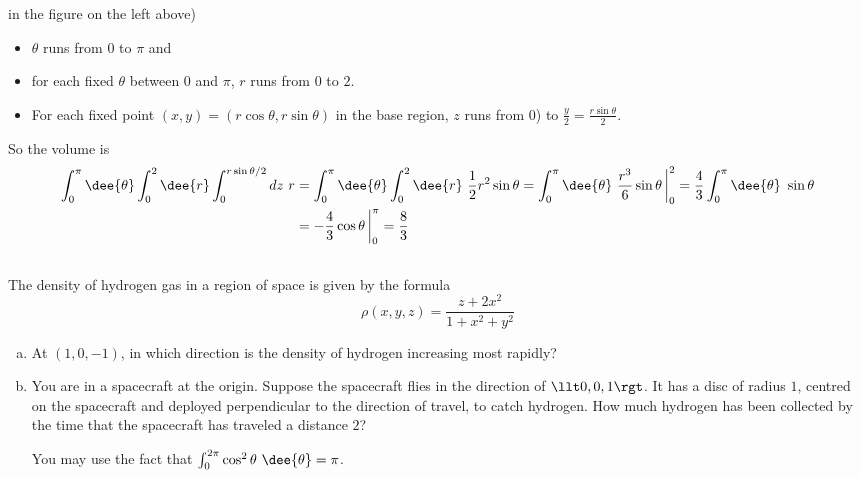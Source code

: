 \begin{solution}
in the figure on the left above)
\begin{itemize}
\item
$\theta$ runs from $0$ to $\pi$ and
\item
for each fixed $\theta$ between $0$ and $\pi$, $r$ runs from $0$ to $2$.
\item
For each fixed point $(x,y)=(r\cos\theta,r\sin\theta)$ in the base
region, $z$ runs from $0$) to $\frac{y}{2}=\frac{r\sin\theta}{2}$.
\end{itemize}
So the volume is
\begin{align*}
\int_0^\pi \dee{\theta}\int_0^2 \dee{r}\int_0^{r\sin\theta/2} dz\ r
&=\int_0^\pi \dee{\theta}\int_0^2 \dee{r}\ \frac{1}{2} r^2\sin\theta
=\int_0^\pi \dee{\theta}\ \frac{r^3}{6}\sin\theta\,\bigg|_0^2
=\frac{4}{3}\int_0^\pi \dee{\theta}\ \sin\theta \\
&=-\frac{4}{3}\cos\theta\,\bigg|_0^\pi
=\frac{8}{3}
\end{align*}
\end{solution}





\subsection*{\Application}

\begin{question}[M200 2014D] %
The density of hydrogen gas in a region of space is given by the formula
\begin{equation*}
\rho(x,y,z) =\frac{z+2x^2}{1+x^2+y^2}
\end{equation*}
\begin{enumerate}[(a)]
\item
At $(1,0,-1)$, in which direction is the density of hydrogen increasing 
most rapidly?
\item
You are in a spacecraft at the origin. Suppose the spacecraft flies 
in the direction of $\llt 0,0,1\rgt$. It has a disc of radius $1$, 
centred on the spacecraft and deployed perpendicular to the direction 
of travel, to catch hydrogen. How much hydrogen has been collected
by the time that the spacecraft has traveled a distance $2$? 

You may use the fact that $\int_0^{2\pi}\cos^2\theta\ \dee{\theta}
=\pi$.
\end{enumerate}
\end{question}

%

